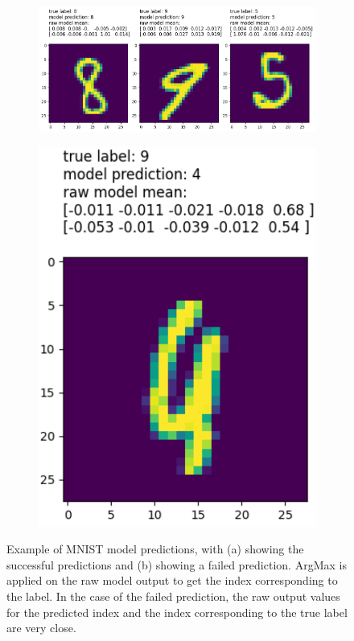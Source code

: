 \documentclass{article}
\begin{document}
\begin{figure}[t]
    \centering
    \begin{subfigure}[b]{0.7\columnwidth}
        \includegraphics[width=\textwidth]{MNIST_examples.png}
        \caption{}
    \end{subfigure}
    \begin{subfigure}[b]{0.23\columnwidth}
        \includegraphics[width=\textwidth]{MNIST_bad_pred.png}
        \caption{}
    \end{subfigure}
    \caption{Example of MNIST model predictions, with (a) showing the successful predictions and (b) showing a failed prediction. ArgMax is applied on the raw model output to get the index corresponding to the label. In the case of the failed prediction, the raw output values for the predicted index and the index corresponding to the true label are very close.}
    \label{fig:MNIST_example}
\end{figure}
\end{document}
